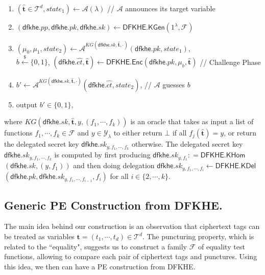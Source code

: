 \documentclass[runningheads,10pt]{llncs}
\begin{document}
\begin{enumerate}

\item $(\widehat{\mathbf{t}}\in \mathcal{T}^d, state_1)\leftarrow \mathcal{A}(\lambda)$ // $\mathcal{A}$ announces its target variable
	
	\item $(\mathsf{dfkhe}.pp, \mathsf{dfkhe}.pk, \mathsf{dfkhe}.sk) \leftarrow \mathsf{DFKHE.KGen}(1^\lambda,\mathcal{F} )$
	
	\item $(\mu_0,\mu_1, state_2)\leftarrow \mathcal{A}^{KG(\mathsf{dfkhe}.sk,\widehat{\mathbf{t}},\cdot)}(\mathsf{dfkhe}.pk, state_1)$, \\
	  $b\xleftarrow{\$} \{0,1\}$, $ (\mathsf{dfkhe}.\widehat{ct},\widehat{\mathbf{t}} ) \leftarrow \mathsf{DFKHE.Enc}(\mathsf{dfkhe}.pk,  \mu_b, \widehat{\mathbf{t}} )$ // Challenge Phase
	\item $b' \leftarrow \mathcal{A}^{KG(\mathsf{dfkhe}.sk,\widehat{\mathbf{t}},\cdot )}(\mathsf{dfkhe}.\widehat{ct}, state_2)$, // $\mathcal{A}$ guesses $b$
	\item output $b'\in \{0,1\}$,	
	\end{enumerate}
where $KG(\mathsf{dfkhe}.sk,\widehat{\mathbf{t}},y,(f_1, \cdots, f_k))$ is an oracle that takes as input a list of functions $f_1, \cdots, f_k\in \mathcal{F}$ and $y\in \mathcal{Y}_\lambda$ to either return  $\bot$ if all $f_j(\widehat{\mathbf{t}})=y$, or return the delegated secret key $\mathsf{dfkhe}.sk_{y, f_1,\cdots, f_{k}}$ otherwise. The delegated secret key $\mathsf{dfkhe}.sk_{y, f_1,\cdots, f_{k}}$ is computed by first producing $\mathsf{dfkhe}.sk_{y, f_1}: =\mathsf{DFKHE.KHom}$ $(\mathsf{dfkhe}.sk, (y,f_1))$ and then doing delegation $\mathsf{dfkhe}.sk_{y, f_1,\cdots, f_{i}}\leftarrow \mathsf{DFKHE.KDel}$ $(\mathsf{dfkhe}.pk, \mathsf{dfkhe}.sk_{y, f_1,\cdots, f_{i-1}}, f_{i} )$ for all $i\in \{2, \cdots, k\}$.
\fi

\subsection{Generic PE Construction from DFKHE.} 
The main idea behind our construction is an observation that 
ciphertext tags  can be treated as  
 variables  $\textbf{t}=(t_1, \cdots, t_d) \in \mathcal{T}^d$. The puncturing property, which is related to the ``equality", suggests us to construct a family $\mathcal{F}$ of equality test functions, allowing to compare each pair of ciphertext tags  and punctures. 
 Using this idea, we then can have a PE  construction from DFKHE.   
\end{document}
